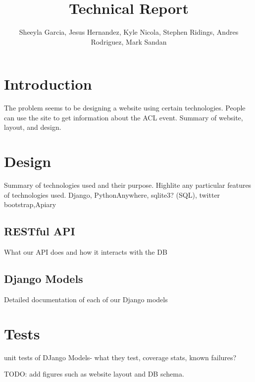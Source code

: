 \documentclass[12pt,leqno]{article}
\title{Technical Report}
\author{Sheeyla Garcia, Jesus Hernandez, Kyle Nicola, Stephen Ridings, Andres Rodriguez, Mark Sandan}
\date{ }
\numberwithin{equation}{section}
\theoremstyle{definition}
\begin{document}
\thispagestyle{plain}
 
\maketitle
 
\tableofcontents
\section{Introduction} 
The problem seems to be designing a website using certain technologies.
People can use the site to get information about the ACL event.
Summary of website, layout, and design.  

\section{Design}
Summary of technologies used and their purpose. Highlite any particular features of technologies used.
Django, PythonAnywhere, sqlite3? (SQL), twitter bootstrap,Apiary

\subsection{RESTful  API}
What our API does and how it interacts with the DB
\subsection{Django Models}
Detailed documentation of each of our Django models
\section{Tests}
unit tests of DJango Models- what they test, coverage stats, known failures?

TODO: add figures such as website layout and DB schema.
\end{document}
